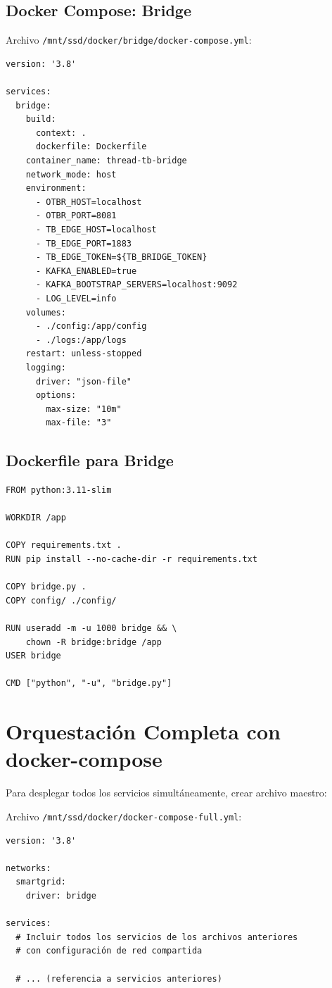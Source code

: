 \subsection{Docker Compose: Bridge}

Archivo \texttt{/mnt/ssd/docker/bridge/docker-compose.yml}:

\begin{verbatim}
version: '3.8'

services:
  bridge:
    build:
      context: .
      dockerfile: Dockerfile
    container_name: thread-tb-bridge
    network_mode: host
    environment:
      - OTBR_HOST=localhost
      - OTBR_PORT=8081
      - TB_EDGE_HOST=localhost
      - TB_EDGE_PORT=1883
      - TB_EDGE_TOKEN=${TB_BRIDGE_TOKEN}
      - KAFKA_ENABLED=true
      - KAFKA_BOOTSTRAP_SERVERS=localhost:9092
      - LOG_LEVEL=info
    volumes:
      - ./config:/app/config
      - ./logs:/app/logs
    restart: unless-stopped
    logging:
      driver: "json-file"
      options:
        max-size: "10m"
        max-file: "3"
\end{verbatim}

\subsection{Dockerfile para Bridge}

\begin{verbatim}
FROM python:3.11-slim

WORKDIR /app

COPY requirements.txt .
RUN pip install --no-cache-dir -r requirements.txt

COPY bridge.py .
COPY config/ ./config/

RUN useradd -m -u 1000 bridge && \
    chown -R bridge:bridge /app
USER bridge

CMD ["python", "-u", "bridge.py"]
\end{verbatim}

\section{Orquestación Completa con docker-compose}

Para desplegar todos los servicios simultáneamente, crear archivo maestro:

Archivo \texttt{/mnt/ssd/docker/docker-compose-full.yml}:

\begin{verbatim}
version: '3.8'

networks:
  smartgrid:
    driver: bridge

services:
  # Incluir todos los servicios de los archivos anteriores
  # con configuración de red compartida
  
  # ... (referencia a servicios anteriores)
\end{verbatim}

